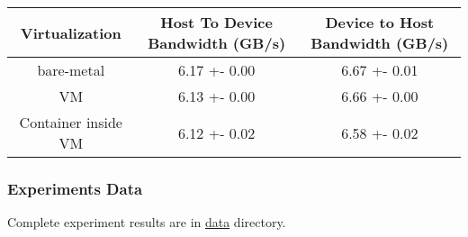 \begin{longtable}[c]{@{}ccc@{}}
\toprule
\begin{minipage}[b]{0.16\columnwidth}\centering\strut
Virtualization
\strut\end{minipage} &
\begin{minipage}[b]{0.39\columnwidth}\centering\strut
Host To Device Bandwidth (GB/s)
\strut\end{minipage} &
\begin{minipage}[b]{0.36\columnwidth}\centering\strut
Device to Host Bandwidth (GB/s)
\strut\end{minipage}\tabularnewline
\midrule
\endhead
\begin{minipage}[t]{0.16\columnwidth}\centering\strut
bare-metal
\strut\end{minipage} &
\begin{minipage}[t]{0.39\columnwidth}\centering\strut
6.17 +- 0.00
\strut\end{minipage} &
\begin{minipage}[t]{0.36\columnwidth}\centering\strut
6.67 +- 0.01
\strut\end{minipage}\tabularnewline
\begin{minipage}[t]{0.16\columnwidth}\centering\strut
VM
\strut\end{minipage} &
\begin{minipage}[t]{0.39\columnwidth}\centering\strut
6.13 +- 0.00
\strut\end{minipage} &
\begin{minipage}[t]{0.36\columnwidth}\centering\strut
6.66 +- 0.00
\strut\end{minipage}\tabularnewline
\begin{minipage}[t]{0.16\columnwidth}\centering\strut
Container inside VM
\strut\end{minipage} &
\begin{minipage}[t]{0.39\columnwidth}\centering\strut
6.12 +- 0.02
\strut\end{minipage} &
\begin{minipage}[t]{0.36\columnwidth}\centering\strut
6.58 +- 0.02
\strut\end{minipage}\tabularnewline
\bottomrule
\end{longtable}

\subsubsection{Experiments Data}\label{experiments-data}

Complete experiment results are in \url{data} directory.

